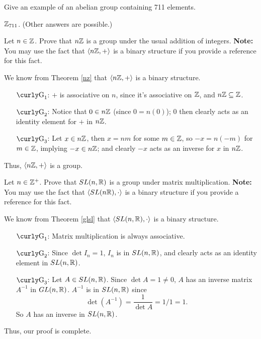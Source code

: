 \begin{exercise}[ID=2K]
Give an example of an abelian group containing 711 elements.
\end{exercise}

\begin{solution}[print=true]
$\mathbb{Z}_{711}$. (Other answers are possible.)
\end{solution}



\begin{exercise}[ID=2M]
Let $n\in \mathbb{Z}$.   Prove that $n\mathbb{Z}$ is a group under the usual addition of integers. \textbf{Note:} You may use the fact that $\langle n\mathbb{Z},+\rangle$ is a binary structure if you provide a reference for this fact.
\end{exercise}

\begin{solution}[print=true]
We know from Theorem \ref{nz} that $\langle n\mathbb{Z},+\rangle$ is a binary structure.

\begin{enumerate}
\item[$\G_1$:] $+$ is
    associative on $n$, since it's associative on
    $\mathbb{Z}$, and $n\mathbb{Z} \subseteq \mathbb{Z}$.

\item[$\G_2$:] Notice that
    $0\in n\mathbb{Z}$ (since $0=n(0)$); 0 then clearly acts as
    an identity element for $+$ in $n\mathbb{Z}$.

\item[$\G_3$:] Let $x\in n\mathbb{Z}$, then $x=nm$ for some $m\in \mathbb{Z}$, so
    $-x=n(-m)$ for $m\in \mathbb{Z}$, implying $-x\in n\mathbb{Z}$;
    and clearly $-x$ acts as an inverse for $x$ in
    $n\mathbb{Z}$.

    \end{enumerate}Thus, $\langle n\mathbb{Z}, +\rangle$ is a group.

    \end{solution}

\begin{exercise}[ID=2N]
 Let $n\in \mathbb{Z}^+$. Prove that $SL(n,\mathbb{R})$  is a group under matrix multiplication.
\textbf{Note:} You may use the fact that $\langle SL(n\mathbb{R}),\cdot\rangle$ is a binary structure if you provide a reference for this fact.
\end{exercise}


\begin{solution}[print=true]
We know from Theorem \ref{glsl} that $\langle SL(n,\mathbb{R}),\cdot\rangle$ is a binary structure.

\begin{enumerate}
\item[$\G_1$:] Matrix multiplication is always associative.

\item[$\G_2$:] Since $\det I_n=1$, $I_n$ is in $SL(n,\mathbb{R})$, and clearly acts as an identity element in $SL(n,\mathbb{R})$.

\item[$\G_3$:] Let $A\in SL(n,\mathbb{R})$.  Since $\det A=1\neq 0$, $A$ has an inverse matrix $A^{-1}$ in $GL(n, \mathbb{R})$.  $A^{-1}$ is in $SL(n,\mathbb{R})$ since $$\det(A^{-1})=\frac{1}{\det A}=1/1=1.$$ So $A$ has an inverse in $SL(n,\mathbb{R})$.
\end{enumerate}
Thus, our proof is complete.
\end{solution}


